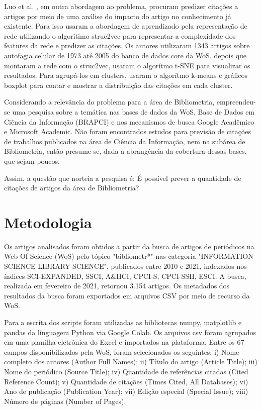 \documentclass[runningheads]{llncs}
\begin{document}
Luo et al. \cite{Luo2020}, em outra abordagem ao problema, procuram predizer citações a artigos por meio de uma análise do impacto do artigo no conhecimento já existente. Para isso usaram a abordagem de aprendizado pela representação de rede utilizando o algorítimo struc2vec para representar a complexidade dos features da rede e predizer as citações. Os autores utilizaram 1343 artigos sobre autofagia celular de 1973 até 2005 do banco de dados core da WoS. depois que montaram a rede com o struc2vec, usaram o algorítmo t-SNE para visualizar os resultados. Para agrupá-los em clusters, usaram o algorítmo k-means e gráficos boxplot para contar e mostrar a distribuição das citações em cada cluster.

Considerando a relevância do problema para a área de Bibliometria, empreendeu-se uma pesquisa sobre a temática nas bases de dados da WoS, Base de Dados em Ciência da Informação (BRAPCI) e nos mecanismos de busca Google Acadêmico e Microsoft Academic. Não foram encontrados estudos para previsão de citações de trabalhos publicados na área de Ciência da Informação, nem na subárea de Bibliometria, então presume-se, dada a abrangência da cobertura dessas bases, que sejam poucos.

Assim, a questão que norteia a pesquisa é: É possível prever a quantidade de citações de artigos da área de Bibliometria?

\section{Metodologia}

Os artigos analisados foram obtidos a partir da busca de artigos de periódicos na Web Of Science (WoS) pelo tópico "bibliometr*" nas categoria "INFORMATION SCIENCE LIBRARY SCIENCE", publicados entre 2010 e 2021, indexados nos índices SCI-EXPANDED, SSCI, A\&HCI, CPCI-S, CPCI-SSH, ESCI. A busca, realizada em fevereiro de 2021, retornou 3.154 artigos. Os metadados dos resultados da busca foram exportados em arquivos CSV por meio de recurso da WoS.

Para a escrita dos scripts foram utilizadas as bibliotecas numpy, matplotlib e pandas da linguagem Python via Google Colab. Os arquivos csv foram agrupados em uma planilha eletrônica do Excel e importados na plataforma. Entre os 67 campos disponibilizados pela WoS, foram selecionados os seguintes: i) Nome completo dos autores (Author Full Names); ii) Título do artigo (Article Title); iii) Nome do periódico (Source Title); iv) Quantidade de referências citadas (Cited Reference Count); v) Quantidade de citações (Times Cited, All Databases); vi) Ano de publicação (Publication Year); vii) Edição especial (Special Issue); viii) Número de páginas (Number of Pages).
\end{document}
